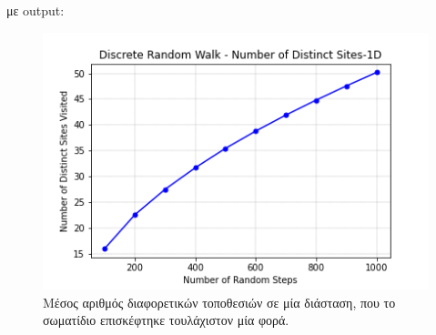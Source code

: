 \gr με {\en output}:
\begin{figure}[H]
\begin{center}
\includegraphics[scale=1]{figures/DRW_NDS_1D.png}
\caption{Μέσος αριθμός διαφορετικών τοποθεσιών σε μία διάσταση, που το σωματίδιο επισκέφτηκε τουλάχιστον μία φορά.}
\label{figuridion3d}
\end{center}
\end{figure}

